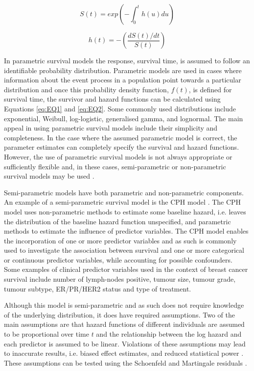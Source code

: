\begin{equation}
S(t) = exp(-\int_0^th(u)du)
\label{eq:EQ3}
\end{equation}

\begin{equation}
h(t) = -(\frac{dS(t)/dt}{S(t)})
\end{equation}

In parametric survival models the response, survival time, is assumed to follow an identifiable probability distribution. Parametric models are used in cases where information about the event process in a population point towards a particular distribution and once this probability density function, $f(t)$, is defined for survival time, the survivor and hazard functions can be calculated using Equations \ref{eq:EQ1} and \ref{eq:EQ2}. Some commonly used distributions include exponential, Weibull, log-logistic, generalised gamma, and lognormal. The main appeal in using parametric survival models include their simplicity and completeness. In the case where the assumed parametric model is correct, the parameter estimates can completely specify the survival and hazard functions. However, the use of parametric survival models is not always appropriate or sufficiently flexible and, in these cases, semi-parametric or non-parametric survival models may be used \citep{kleinbaum_klein_2012}.   

Semi-parametric models have both parametric and non-parametric components. An example of a semi-parametric survival model is the CPH model \citep{Cox, kleinbaum_klein_2012}. The CPH model uses non-parametric methods to estimate some baseline hazard, i.e. leaves the distribution of the baseline hazard function unspecified, and parametric methods to estimate the influence of predictor variables. The CPH model enables the incorporation of one or more predictor variables and as such is commonly used to investigate the association between survival and one or more categorical or continuous predictor variables, while accounting for possible confounders. Some examples of clinical predictor variables used in the context of breast cancer survival include number of lymph-nodes positive, tumour size, tumour grade, tumour subtype, ER/PR/HER2 status and type of treatment. 

Although this model is semi-parametric and as such does not require knowledge of the underlying distribution, it does have required assumptions. Two of the main assumptions are that hazard functions of different individuals are assumed to be proportional over time $t$ and the relationship between the log hazard and each predictor is assumed to be linear. Violations of these assumptions may lead to inaccurate results, i.e. biased effect estimates, and reduced statistical power \citep{pmid35070171}. These assumptions can be tested using the Schoenfeld and Martingale residuals \citep{Patil_Dessai_2019}. 


